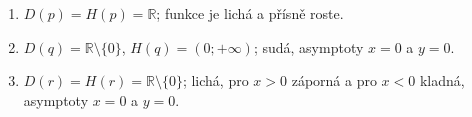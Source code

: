 \documentclass[11pt,a4paper]{article}
\begin{document}
\begin{zadaniReseniBox}[title={Domácí úkol}]
\begin{enumerate}[label=\alph*)]
$D(m^{-1})=\langle0;+\infty)$.
\item $D(p)=H(p)=\mathbb R$; funkce je lichá a přísně roste.
\item $D(q)=\mathbb R\setminus\{0\}$, $H(q)=(0;+\infty)$; sudá, asymptoty $x=0$ a $y=0$.
\item $D(r)=H(r)=\mathbb R\setminus\{0\}$; lichá, pro $x>0$ záporná a pro $x<0$ kladná, asymptoty $x=0$ a $y=0$.
\end{enumerate}
\end{zadaniReseniBox}
\end{document}
